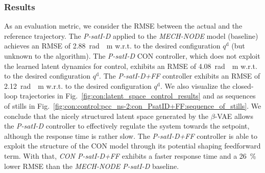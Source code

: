 \subsubsection{Results} 
As an evaluation metric, we consider the \gls{RMSE} between the actual and the reference trajectory.
The \emph{P-satI-D} applied to the \emph{MECH-NODE} model (baseline) achieves an \gls{RMSE} of \SI{2.88}{rad \per m} w.r.t. to the desired configuration $q^\mathrm{d}$ (but unknown to the algorithm).
The \emph{P-satI-D} \gls{CON} controller, which does not exploit the learned latent dynamics for control, exhibits an \gls{RMSE} of \SI{4.08}{rad \per m} w.r.t. to the desired configuration $q^\mathrm{d}$.
The \emph{P-satI-D+FF} controller exhibits an \gls{RMSE} of \SI{2.12}{rad \per m} w.r.t. to the desired configuration $q^\mathrm{d}$.
We also visualize the closed-loop trajectories in Fig.~\ref{fig:con:latent_space_control_results} and as sequences of stills in Fig.~\ref{fig:con:control:pcc_ns-2:con_PsatID+FF:sequence_of_stills}.
We conclude that the nicely structured latent space generated by the $\beta$-VAE allows the \emph{P-satI-D} controller to effectively regulate the system towards the setpoint, although the response time is rather slow. The \emph{P-satI-D+FF} controller is able to exploit the structure of the \gls{CON} model through its potential shaping feedforward term.
With that, \emph{CON P-satI-D+FF} exhibits a faster response time and a \SI{26}{\percent} lower \gls{RMSE} than the \emph{MECH-NODE P-satI-D} baseline.
